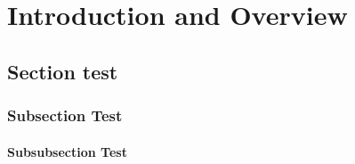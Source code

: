 \chapter{Introduction and Overview}

\lipsum

\section{Section test}

\lipsum[1-11]

\subsection{Subsection Test}

\lipsum[1-9]

\subsubsection{Subsubsection Test}

\lipsum[1-7]